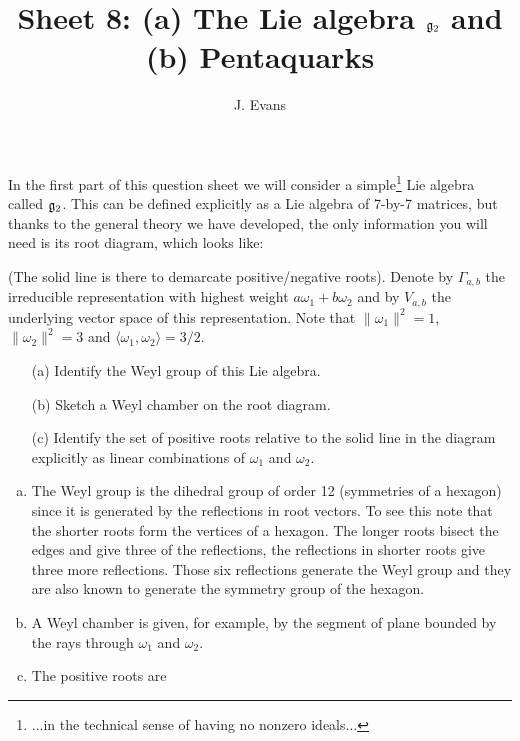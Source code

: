 \documentclass[12pt]{article}
\title{Sheet 8: (a) The Lie algebra $\mathfrak{g}_2$ and (b) Pentaquarks}
\author{J. Evans}
\date{}
\begin{document}
\maketitle

In the first part of this question sheet we will consider a simple\footnote{...in the technical sense of having no nonzero ideals...} Lie algebra called $\mathfrak{g}_2$. This can be defined explicitly as a Lie algebra of 7-by-7 matrices, but thanks to the general theory we have developed, the only information you will need is its root diagram, which looks like:

\gtwoadj

(The solid line is there to demarcate positive/negative roots). Denote by $\Gamma_{a,b}$ the irreducible representation with highest weight $a\omega_1+b\omega_2$ and by $V_{a,b}$ the underlying vector space of this representation. Note that $\|\omega_1\|^2=1$, $\|\omega_2\|^2=3$ and $\langle\omega_1,\omega_2\rangle=3/2$.

\bigskip

\begin{question}
\begin{enumerate}
\item[(a)] Identify the Weyl group of this Lie algebra.
\item[(b)] Sketch a Weyl chamber on the root diagram.
\item[(c)] Identify the set of positive roots relative to the solid line in the diagram explicitly as linear combinations of $\omega_1$ and $\omega_2$.
\end{enumerate}
\end{question}

\begin{answer}
\begin{enumerate}[(a)]
\item The Weyl group is the dihedral group of order 12 (symmetries of a hexagon) since it is generated by the reflections in root vectors. To see this note that the shorter roots form the vertices of a hexagon. The longer roots bisect the edges and give three of the reflections, the reflections in shorter roots give three more reflections. Those six reflections generate the Weyl group and they are also known to generate the symmetry group of the hexagon.
\item A Weyl chamber is given, for example, by the segment of plane bounded by the rays through $\omega_1$ and $\omega_2$.
\item The positive roots are 

\gtwoadjpos

\end{enumerate}
\end{answer}
\newpage
\end{document}
